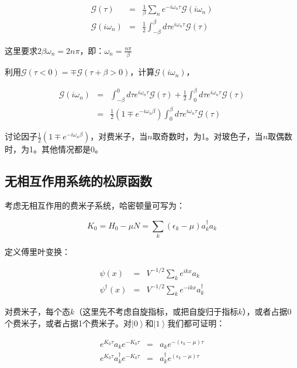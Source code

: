 \begin{eqnarray*}
\mathcal{G} (\tau) &=& \frac{1}{\beta} \sum\limits_n e^{-i \omega_n \tau} \mathcal{G} (i \omega_n) \\
\mathcal{G} (i \omega_n) & = & \frac{1}{2} \int_{- \beta}^{\beta} d \tau e^{i \omega_n \tau} \mathcal{G} (\tau) 
\end{eqnarray*}

这里要求$2 \beta \omega_n = 2 n \pi $，即：$\omega_n = \frac{n \pi}{\beta}$

利用$\mathcal{G} (\tau < 0)  = \mp \mathcal{G}(\tau + \beta >0) $，计算$\mathcal{G} (i \omega_n)$，

\begin{eqnarray*}
\mathcal{G} (i \omega_n) & = & \int_{-\beta}^0 d \tau e^{i \omega_n \tau } \mathcal{G} ( \tau ) + \frac{1}{2} \int_0^\beta d \tau e^{i \omega_n \tau } \mathcal{G} ( \tau ) \\
{} & = & \frac{1}{2} (1 \mp e^{-i \omega_n \beta} ) \int_0^\beta d \tau e^{i \omega_n \tau} \mathcal{G}(\tau)
\end{eqnarray*}

讨论因子$\frac{1}{2} (1 \mp e^{-i \omega_n \beta} )$，对费米子，当$n$取奇数时，为1。对玻色子，当$n$取偶数时，为1。其他情况都是0。

\subsection{无相互作用系统的松原函数}

考虑无相互作用的费米子系统，哈密顿量可写为：

\begin{equation}
K_0 = H_0 - \mu N = \sum\limits_{k} ( \epsilon_k - \mu ) a_k^\dagger a_k
\end{equation}

定义傅里叶变换：

\begin{eqnarray*}
\psi(x)  &=& V^{-1/2} \sum\limits_k e^{i k x} a_k  \\
\psi^\dagger (x)  &=& V^{-1/2} \sum\limits_k e^{- i k x} a^\dagger_k 
\end{eqnarray*}

对费米子，每个态$k$（这里先不考虑自旋指标，或把自旋归于指标$k$），或者占据0个费米子，或者占据1个费米子。对$\left| 0 \right\rangle$和$\left| 1 \right\rangle$我们都可证明：

\begin{eqnarray*}
e^{K_0 \tau} a_k e^{- K_0 \tau} &=& a_k e^{ -(\epsilon_k - \mu)\tau } \\
e^{K_0 \tau} a^\dagger_k e^{- K_0 \tau} &=& a^\dagger_k e^{ (\epsilon_k - \mu) \tau}
\end{eqnarray*}


